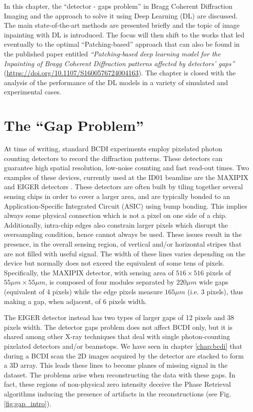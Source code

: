 
In this chapter, the ``detector - gaps problem'' in Bragg Coherent Diffraction Imaging and the approach to solve it
using Deep Learning (DL) are discussed. The main state-of-the-art methods are presented briefly and
the topic of image inpainting with DL is introduced. The focus will then shift to the works that led
eventually to the optimal ``Patching-based'' approach that can also be found in the published paper entitled
 \textit{``Patching-based deep learning model for the Inpainting of Bragg Coherent Diffraction patterns affected 
 by detectors' gaps''} (\url{https://doi.org/10.1107/S1600576724004163}). The chapter is closed with the analysis 
 of the performance of the DL models in a variety of simulated and experimental cases.  

\section{The ``Gap Problem''}\label{sec:gaps}

At time of writing, standard BCDI experiments employ pixelated photon counting detectors to record the diffraction
patterns. These detectors can guarantee high spatial resolution, low-noise counting and fast read-out times. Two examples 
of these devices, currently used at the ID01 beamline are the MAXIPIX and EIGER detectors \cite{ponchut_maxipix_2011, Eiger_Johnson_2014}.
These detectors are often built by tiling together several sensing chips in order to cover a larger area, and are
typically bonded to an Application-Specific Integrated Circuit (ASIC) using bump bonding. This implies always some 
physical connection which is not a pixel on one side of a chip. Additionally, intra-chip edges also constrain larger 
pixels which disrupt the oversampling condition, hence cannot always be used.
These issues result in the presence, in the overall sensing region, of vertical and/or horizontal stripes that are not 
filled with useful signal. The width of these lines varies depending on the device but normally does not exceed the equivalent 
of some tens of pixels. Specifically, the MAXIPIX detector, with sensing area of $516\times516$ pixels of 
$55\mu m\times55\mu m$, is composed of four modules separated by $220\mu m$ wide gaps (equivalent of 4 pixels) while the 
edge pixels measure $165\mu m$ (i.e. 3 pixels), thus making a gap, when adjacent, of 6 pixels width.

The EIGER detector instead has two types of larger gaps of 12 pixels and 38 pixels width.
The detector gaps problem does not affect BCDI only, but it is shared among other X-ray techniques that deal with single photon-counting
pixelated detectors and/or beamstops.
We have seen in chapter \ref{chap:bcdi} that during a BCDI scan the 2D images acquired by the detector are stacked to form
a 3D array. This leads these lines to become planes of missing signal in the dataset.
The problems arise when reconstructing the data with these gaps. In fact, these regions of non-physical zero intensity
deceive the Phase Retrieval algorithms inducing the presence of artifacts in the reconstructions \cite{carnis_towards_2019} (see Fig.\ref{fig:gap_intro}).

